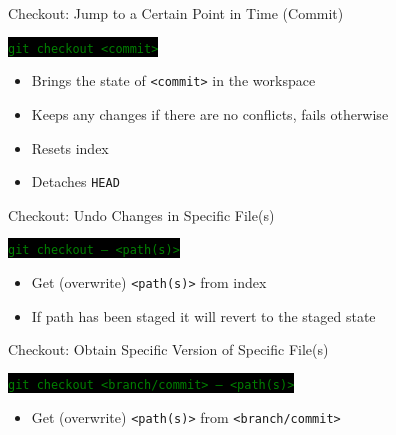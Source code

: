 \documentclass[
14pt,
aspectratio=169,
usenames,
dvipsnames,
x11names]{beamer}
\newcommand{\code}[1]{{\small\colorbox{black}{\textcolor{green}{\texttt{#1}}}}}
\begin{document}



\begin{frame}{Checkout: Jump to a Certain Point in Time (Commit)}

  \code{git checkout <commit>}
  \begin{itemize}
  \item Brings the state of \texttt{<commit>} in the workspace
  \item Keeps any changes if there are no conflicts, fails otherwise
  \item Resets index
  \item Detaches \texttt{HEAD}
  \end{itemize}

\end{frame}

\begin{frame}{Checkout: Undo Changes in Specific File(s)}

  \code{git checkout -- <path(s)>}
  \begin{itemize}
  \item Get (overwrite) \texttt{<path(s)>} from \alert{index}
  \item If path has been \alert{staged} it will revert to the \alert{staged state}
  \end{itemize}
\end{frame}

\begin{frame}{Checkout: Obtain Specific Version of Specific File(s)}

  \code{git checkout <branch/commit> -- <path(s)>}
  \begin{itemize}
  \item Get (overwrite) \texttt{<path(s)>} from \texttt{<branch/commit>}
  \end{itemize}
\end{frame}
\end{document}
